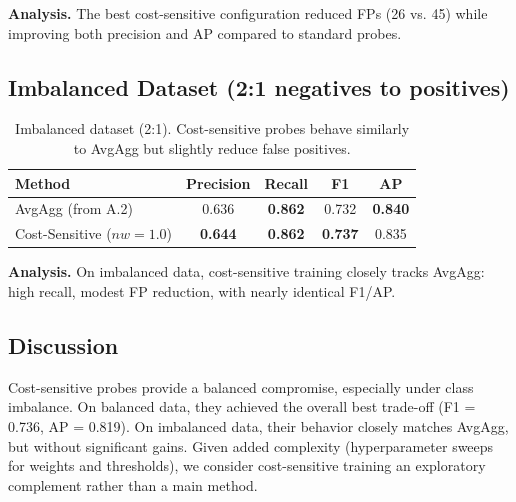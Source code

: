 \documentclass{article}
\begin{document}
\textbf{Analysis.} The best cost-sensitive configuration reduced FPs (26 vs. 45) while improving both precision and AP compared to standard probes.

\subsection{Imbalanced Dataset (2:1 negatives to positives)}
\begin{table}[h]
\centering
\begin{tabular}{lcccc}
\toprule
\textbf{Method} & \textbf{Precision} & \textbf{Recall} & \textbf{F1} & \textbf{AP} \\
\midrule
AvgAgg (from A.2) & 0.636 & \textbf{0.862} & 0.732 & \textbf{0.840} \\
Cost-Sensitive ($nw=1.0$) & \textbf{0.644} & \textbf{0.862} & \textbf{0.737} & 0.835 \\
\bottomrule
\end{tabular}
\vspace{1em}
\caption{Imbalanced dataset (2:1). Cost-sensitive probes behave similarly to AvgAgg but slightly reduce false positives.}
\end{table}

\textbf{Analysis.} On imbalanced data, cost-sensitive training closely tracks AvgAgg: high recall, modest FP reduction, with nearly identical F1/AP.

\subsection{Discussion}
Cost-sensitive probes provide a balanced compromise, especially under class imbalance. On balanced data, they achieved the overall best trade-off (F1 = 0.736, AP = 0.819). On imbalanced data, their behavior closely matches AvgAgg, but without significant gains. Given added complexity (hyperparameter sweeps for weights and thresholds), we consider cost-sensitive training an exploratory complement rather than a main method.
\end{document}
